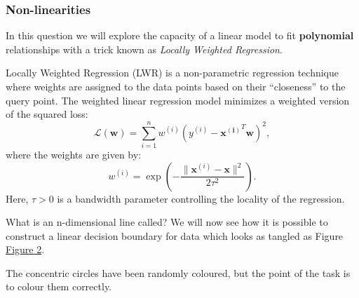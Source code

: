 \documentclass[12pt,dvipsnames,addpoints]{exam}
\renewcommand\vec{\mathbf}
\begin{document}
\subsubsection{Non-linearities}
\begin{questions}
    \setcounter{question}{19}
    \question[2] In this question we will explore the capacity of a linear model to fit \textbf{polynomial} relationships with a trick known as \emph{Locally Weighted Regression}.

    Locally Weighted Regression (LWR) is a non-parametric regression technique where weights are assigned to the data points based on their ``closeness'' to the query point. The weighted linear regression model minimizes a weighted version of the squared loss:
    \[
    \mathcal{L}(\vec{w}) = \sum_{i=1}^n w^{(i)}\left(y^{(i)} - \vec{x^{(i)}}^T\vec{w}\right)^2,
    \]
    where the weights are given by:
    \[
    w^{(i)} = \exp\left(-\frac{\|\vec{x}^{(i)} - \vec{x}\|^2}{2\tau^2}\right).
    \]
    Here, \(\tau > 0\) is a bandwidth parameter controlling the locality of the regression. 
    \question[1] What is an n-dimensional line called?
    \question[3] We will now see how it is possible to construct a linear decision boundary for data which looks as tangled as Figure \hyperref[fig:kernel]{Figure 2}.

    The concentric circles have been randomly coloured, but the point of the task is to colour them correctly. 


\end{questions}
\end{document}
